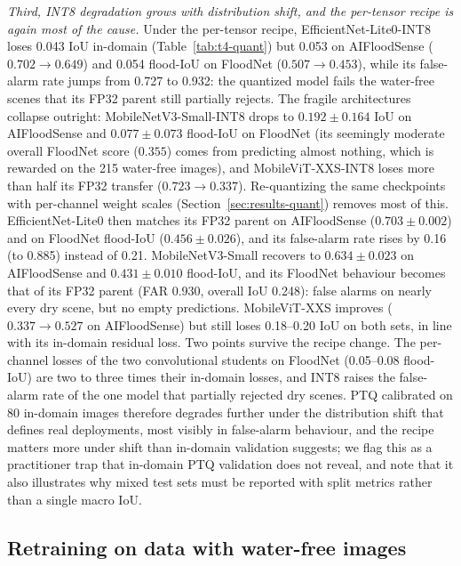\emph{Third, INT8 degradation grows with distribution shift, and the per-tensor recipe is again most of the cause.} Under the per-tensor recipe, EfficientNet-Lite0-INT8 loses 0.043 IoU in-domain (Table~\ref{tab:t4-quant}) but 0.053 on AIFloodSense ($0.702 \rightarrow 0.649$) and 0.054 flood-IoU on FloodNet ($0.507 \rightarrow 0.453$), while its false-alarm rate jumps from 0.727 to 0.932: the quantized model fails the water-free scenes that its FP32 parent still partially rejects. The fragile architectures collapse outright: MobileNetV3-Small-INT8 drops to $0.192 \pm 0.164$ IoU on AIFloodSense and $0.077 \pm 0.073$ flood-IoU on FloodNet (its seemingly moderate overall FloodNet score ($0.355$) comes from predicting almost nothing, which is rewarded on the 215 water-free images), and MobileViT-XXS-INT8 loses more than half its FP32 transfer ($0.723 \rightarrow 0.337$). Re-quantizing the same checkpoints with per-channel weight scales (Section~\ref{sec:results-quant}) removes most of this. EfficientNet-Lite0 then matches its FP32 parent on AIFloodSense ($0.703 \pm 0.002$) and on FloodNet flood-IoU ($0.456 \pm 0.026$), and its false-alarm rate rises by 0.16 (to 0.885) instead of 0.21. MobileNetV3-Small recovers to $0.634 \pm 0.023$ on AIFloodSense and $0.431 \pm 0.010$ flood-IoU, and its FloodNet behaviour becomes that of its FP32 parent (FAR 0.930, overall IoU 0.248): false alarms on nearly every dry scene, but no empty predictions. MobileViT-XXS improves ($0.337 \rightarrow 0.527$ on AIFloodSense) but still loses 0.18--0.20 IoU on both sets, in line with its in-domain residual loss. Two points survive the recipe change. The per-channel losses of the two convolutional students on FloodNet (0.05--0.08 flood-IoU) are two to three times their in-domain losses, and INT8 raises the false-alarm rate of the one model that partially rejected dry scenes. PTQ calibrated on 80 in-domain images therefore degrades further under the distribution shift that defines real deployments, most visibly in false-alarm behaviour, and the recipe matters more under shift than in-domain validation suggests; we flag this as a practitioner trap that in-domain PTQ validation does not reveal, and note that it also illustrates why mixed test sets must be reported with split metrics rather than a single macro IoU.

\subsection{Retraining on data with water-free images}
\label{sec:results-combined}

